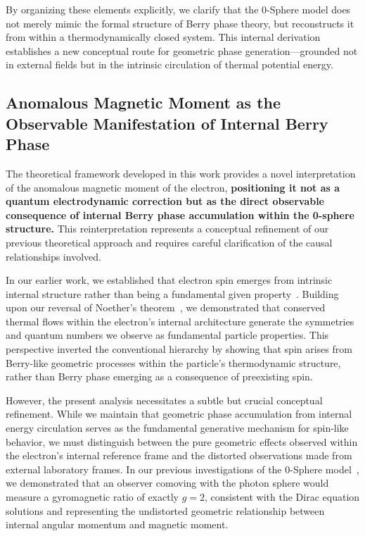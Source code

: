 \documentclass[%
 reprint,
 amsmath,amssymb,
 aps,
]{revtex4-1}
\numberwithin{equation}{section}%
\begin{document}
By organizing these elements explicitly, we clarify that the 0-Sphere model does not merely mimic the formal structure of Berry phase theory, but reconstructs it from within a thermodynamically closed system. This internal derivation establishes a new conceptual route for geometric phase generation—grounded not in external fields but in the intrinsic circulation of thermal potential energy. 


\subsection{Anomalous Magnetic Moment as the Observable Manifestation of Internal Berry Phase} \label{subsec:anomalous_magnetic}

The theoretical framework developed in this work provides a novel interpretation of the anomalous magnetic moment of the electron, \textbf{positioning it not as a quantum electrodynamic correction but as the direct observable consequence of internal Berry phase accumulation within the 0-sphere structure.} This reinterpretation represents a conceptual refinement of our previous theoretical approach and requires careful clarification of the causal relationships involved.

In our earlier work, we established that electron spin emerges from intrinsic internal structure rather than being a fundamental given property~\cite{hanamura2309.0047}. Building upon our reversal of Noether's theorem~\cite{hanamura2506.0119}, we demonstrated that conserved thermal flows within the electron's internal architecture generate the symmetries and quantum numbers we observe as fundamental particle properties. This perspective inverted the conventional hierarchy by showing that spin arises from Berry-like geometric processes within the particle's thermodynamic structure, rather than Berry phase emerging as a consequence of preexisting spin.

However, the present analysis necessitates a subtle but crucial conceptual refinement. While we maintain that geometric phase accumulation from internal energy circulation serves as the fundamental generative mechanism for spin-like behavior, we must distinguish between the pure geometric effects observed within the electron's internal reference frame and the distorted observations made from external laboratory frames. In our previous investigations of the 0-Sphere model~\cite{hanamura2501.0130}, we demonstrated that an observer comoving with the photon sphere would measure a gyromagnetic ratio of exactly $g = 2$, consistent with the Dirac equation solutions and representing the undistorted geometric relationship between internal angular momentum and magnetic moment.
\end{document}

